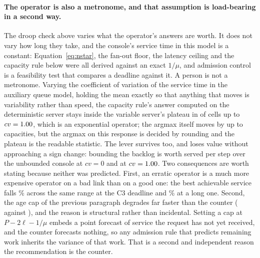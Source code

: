 \documentclass[11pt]{article}
\begin{document}
\paragraph{The operator is also a metronome, and that assumption is load-bearing in a second way.} The droop check above varies what the operator's answers are worth. It does not vary how long they take, and the console's service time in this model is a constant: Equation~\ref{eq:nstar}, the fan-out floor, the latency ceiling and the capacity rule below were all derived against an exact $1/\mu$, and admission control is a feasibility test that compares a deadline against it. A person is not a metronome. Varying the coefficient of variation of the service time in the auxiliary queue model, holding the mean exactly so that anything that moves is variability rather than speed, the capacity rule's answer computed on the deterministic server stays inside the variable server's plateau in \QcapCvCells{} of \QcapCvCells{} cells up to $cv = 1.00{}$, which is an exponential operator; the argmax itself moves by up to \QcapCvShiftWorst{} capacities, but the argmax on this response is decided by rounding and the plateau is the readable statistic. The lever survives too, and loses value without approaching a sign change: bounding the backlog is worth \QcapCvBoundMetro{} served per step over the unbounded console at $cv = 0$ and \QcapCvBoundNoisy{} at $cv = 1.00{}$. Two consequences are worth stating because neither was predicted. First, an erratic operator is a much more expensive operator on a bad link than on a good one: the best achievable service falls \QcapCvLossJam\% across the same range at the C3 deadline and \QcapCvLossLong\% at a long one. Second, the age cap of the previous paragraph degrades far faster than the counter (\QcapCvAgeNoisy{} against \QcapCvBoundNoisy{}), and the reason is structural rather than incidental. Setting a cap at $P - 2\ell - 1/\mu$ embeds a point forecast of service the request has not yet received, and the counter forecasts nothing, so any admission rule that predicts remaining work inherits the variance of that work. That is a second and independent reason the recommendation is the counter.
\end{document}
